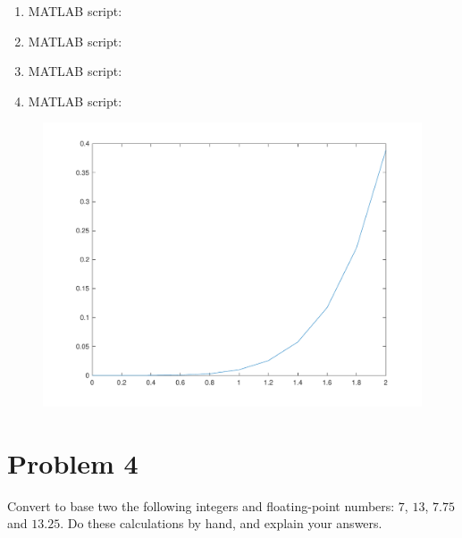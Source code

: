 \begin{solution}
  \quad
  \begin{enumerate}
    \item MATLAB script: 
    \item MATLAB script: 
    \item MATLAB script: 
    \item MATLAB script: 
  \end{enumerate}
  
  \begin{figure}[!hbtp]
    \centering
    \includegraphics[width=0.75\linewidth]{../src/hw1_p3_c.pdf}
  \end{figure}
\end{solution}

\section{Problem 4}%
\label{sec:problem_4}
Convert to base two the following integers and floating-point numbers: $7$, $13$, $7.75$ and $13.25$. Do these calculations by hand, and explain your answers.
\begin{solution}
  \quad \vfill %
\end{solution}

